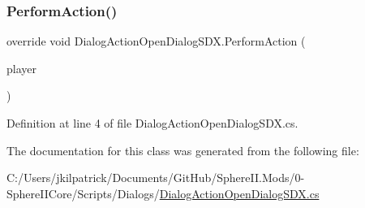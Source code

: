 \subsubsection{\texorpdfstring{PerformAction()}{PerformAction()}}
{\footnotesize\ttfamily override void Dialog\+Action\+Open\+Dialog\+S\+D\+X.\+Perform\+Action (\begin{DoxyParamCaption}\item[{Entity\+Player}]{player }\end{DoxyParamCaption})}



Definition at line 4 of file Dialog\+Action\+Open\+Dialog\+S\+D\+X.\+cs.



The documentation for this class was generated from the following file\+:\begin{DoxyCompactItemize}
\item 
C\+:/\+Users/jkilpatrick/\+Documents/\+Git\+Hub/\+Sphere\+I\+I.\+Mods/0-\/\+Sphere\+I\+I\+Core/\+Scripts/\+Dialogs/\mbox{\hyperlink{_dialog_action_open_dialog_s_d_x_8cs}{Dialog\+Action\+Open\+Dialog\+S\+D\+X.\+cs}}\end{DoxyCompactItemize}
